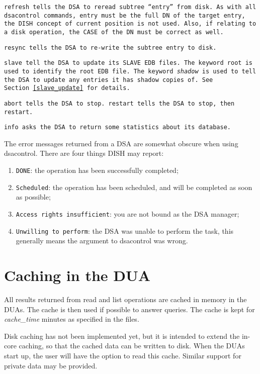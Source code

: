 \tt refresh\rm \ tells the DSA to reread subtree ``entry'' from disk.
As with all dsacontrol commands, entry must be the full 
DN of the target
entry, the DISH concept of current position is not used.
Also, if relating to a disk operation, the CASE of the DN must be correct
as well.

\tt resync\rm \ tells the DSA to re-write the subtree entry to disk.

\tt slave\rm \ tell the DSA to update its SLAVE EDB files.
The keyword root is used to identify the root EDB file.
The keyword {\em shadow} is used to tell the DSA to update any entries
it has shadow copies of.
See Section~\ref{slave_update} for details.

\tt abort\rm \ tells the DSA to stop.
\tt restart\rm \ tells the DSA to stop, then restart.

\tt info\rm \ asks the DSA to return some statistics about its database.

The error messages returned from a DSA are somewhat obscure when using
dsacontrol. 
There are four things DISH may report: 
\begin{enumerate}
\item \verb+DONE+: the operation has been successfully completed; 
\item \verb+Scheduled+: the operation has been scheduled, and will be
completed as soon as possible;
\item \verb+Access rights insufficient+: you are not bound as the DSA manager;
\item \verb+Unwilling to perform+:  the DSA was unable to perform 
the task, this generally means the argument to dsacontrol was wrong.
\end{enumerate}

\section {Caching in the DUA}
\label {dua_cache}

All results returned from read and list operations are cached in memory
in the DUAs.  The cache is then used if possible to answer queries.
The cache is kept for {\em cache\_time} minutes as specified in the
 files.

Disk caching has not been implemented yet,
but it is intended to extend the in-core caching, 
so that the cached data can be written to disk.  When the DUAs start up, the
user will have the option to read this cache.
Similar support for private data may be provided.


